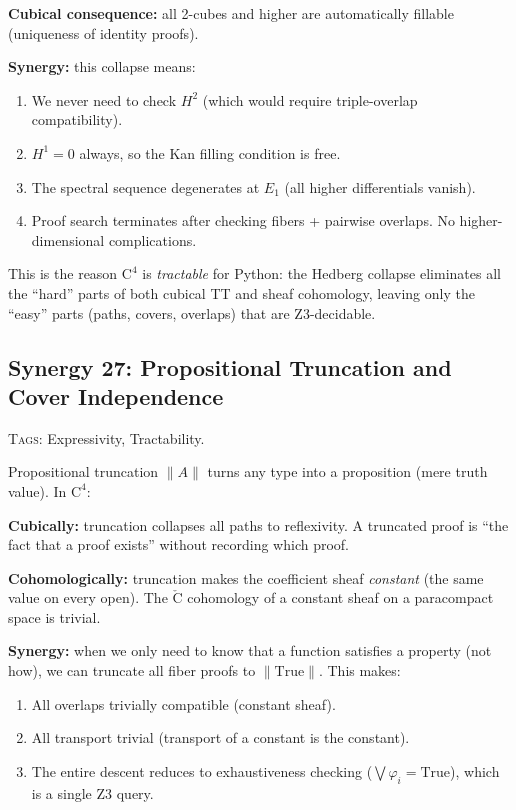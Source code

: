 \documentclass[11pt,a4paper]{article}
\theoremstyle{definition}
\theoremstyle{plain}
\newcommand{\Cech}{\check{\mathrm{C}}}
\newcommand{\Hone}{H^1}
\newcommand{\Htwo}{H^2}
\begin{document}
\textbf{Cubical consequence:} all 2-cubes and higher are
automatically fillable (uniqueness of identity proofs).

\textbf{Synergy:} this collapse means:
\begin{enumerate}
\item We never need to check $\Htwo$ (which would require
  triple-overlap compatibility).
\item $\Hone = 0$ always, so the Kan filling condition is free.
\item The spectral sequence degenerates at $E_1$ (all higher
  differentials vanish).
\item Proof search terminates after checking fibers + pairwise
  overlaps.  No higher-dimensional complications.
\end{enumerate}

This is the reason $\mathrm{C}^4$ is \emph{tractable} for Python:
the Hedberg collapse eliminates all the ``hard'' parts of both
cubical TT and sheaf cohomology, leaving only the ``easy'' parts
(paths, covers, overlaps) that are Z3-decidable.


\subsection{Synergy 27: Propositional Truncation and Cover Independence}
\label{sec:syn-truncation}

\textsc{Tags:} Expressivity, Tractability.

\medskip\noindent
Propositional truncation $\|A\|$ turns any type into a proposition
(mere truth value).  In $\mathrm{C}^4$:

\textbf{Cubically:} truncation collapses all paths to reflexivity.
A truncated proof is ``the fact that a proof exists'' without
recording which proof.

\textbf{Cohomologically:} truncation makes the coefficient sheaf
\emph{constant} (the same value on every open).  The $\Cech$
cohomology of a constant sheaf on a paracompact space is trivial.

\textbf{Synergy:} when we only need to know that a function
satisfies a property (not how), we can truncate all fiber proofs
to $\|\mathrm{True}\|$.  This makes:
\begin{enumerate}
\item All overlaps trivially compatible (constant sheaf).
\item All transport trivial (transport of a constant is the constant).
\item The entire descent reduces to exhaustiveness checking
  ($\bigvee \varphi_i = \mathrm{True}$), which is a single Z3 query.
\end{enumerate}
\end{document}
